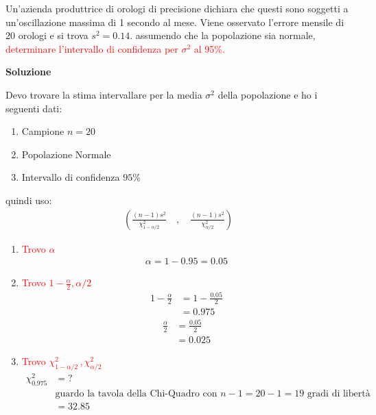 \documentclass{article}  %
\theoremstyle{definition}
\begin{document}
\begin{esercizio}[Esercizio 3]
	Un'azienda produttrice di orologi di precisione dichiara che questi sono soggetti a un'oscillazione massima di 1 secondo al mese. Viene
	osservato l'errore mensile di 20 orologi e si trova $s^2=0.14$.
	assumendo che la popolazione sia normale, \textcolor{red}
	{determinare l'intervallo di confidenza per $\sigma^2$ al 95$\%$.}
	\begin{center}
		\textbf{Soluzione}
	\end{center}
	Devo trovare la stima intervallare per la media $\sigma^2$ della popolazione e ho i seguenti dati:
	\begin{enumerate}
		\item Campione $n=20$
		\item Popolazione Normale
		\item Intervallo di confidenza $95\%$
	\end{enumerate}
	quindi uso:
	\begin{align*}
		\left(\frac{(n-1)s^2}{\chi^2_{1-\alpha /2}} \quad , \quad \frac{(n-1)s^2}{\chi^2_{\alpha /2}}\right)
	\end{align*}
	\begin{enumerate}
		\item \textcolor{red}{Trovo $\alpha$}
		      \begin{align*}
			      \alpha = 1 - 0.95 = 0.05
		      \end{align*}
		\item \textcolor{red}{Trovo $1-\frac{\alpha}{2}, \alpha/2$}
		      \begin{align*}
			      1-\frac{\alpha}{2} & = 1 - \frac{0.05}{2} \\
			                         & = 0.975
		      \end{align*}
		      \begin{align*}
			      \frac{\alpha}{2} & = \frac{0.05}{2} \\
			                       & = 0.025
		      \end{align*}
		\item \textcolor{red}{Trovo $\chi^2_{1-\alpha /2} \,$,$\, \chi^2_{\alpha /2}$}
		      \begin{align*}
			      \chi^2_{0.975} & = ?                                                                         \\
			                     & \text{guardo la tavola della Chi-Quadro con $n-1=20-1=19$ gradi di libertà} \\
			                     & = 32.85
		      \end{align*}

\end{enumerate}
\end{esercizio}
\end{document}
